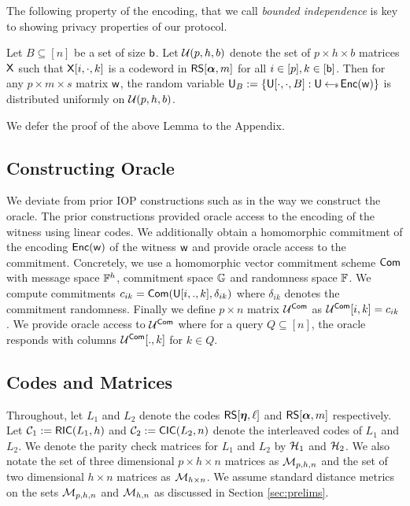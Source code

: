 The following property of the encoding, that we call {\em bounded independence}
is key to showing privacy properties of our protocol.
\begin{lemma}\label{lem:boundedindependence}
Let $B\subseteq [n]$ be a set of size $\mathsf{b}$. Let $\mathcal{U}(p,h,b)$ denote the
set of $p\times h\times b$ matrices $\mathsf{X}$ such
that $\mathsf{X}[i,\cdot,k]$ is a codeword in $\mathsf{RS}[\bm{\alpha},m]$ for all $i\in
[p],k\in [\mathsf{b}]$. Then for any $p\times m\times s$ matrix $\mathsf{w}$, the random
variable $\mathsf{U}_B := \{\mathsf{U}[\cdot,\cdot,B]: \mathsf{U}\hskip2.3pt{\gets\!\!\mbox{\tiny${\$}$\normalsize}}\, \mathsf{Enc}(\mathsf{w})\}$ is
distributed uniformly on $\mathcal{U}(p,h,b)$.
\end{lemma}
We defer the proof of the above Lemma to the Appendix.

\subsection{Constructing Oracle}\label{sec:construct_oracle} 
We deviate from prior IOP constructions
such as \cite{ligero,Aurora} in the way we construct the oracle. The prior
constructions provided oracle access to the encoding of the witness using linear
codes. We
additionally obtain a homomorphic commitment of the encoding $\mathsf{Enc}(\mathsf{w})$ of the
witness $\mathsf{w}$ and provide oracle access to the commitment. Concretely, we use a
homomorphic vector commitment scheme $\mathsf{Com}$ with message space $\mathbb{F}^h$,
commitment space $\mathbb{G}$ and randomness space $\mathbb{F}$. We compute commitments
$c_{ik}=\mathsf{Com}(\mathsf{U}[i,.,k],\delta_{ik})$ where $\delta_{ik}$ denotes the
commitment randomness. Finally we define $p\times n$ matrix $\mathcal{U}^{\mathsf{Com}}$ as
$\mathcal{U}^{\mathsf{Com}}[i,k]=c_{ik}$. We provide oracle access to $\mathcal{U}^{\mathsf{Com}}$ where for a
query $Q\subseteq [n]$, the oracle responds with columns $\mathcal{U}^{\mathsf{Com}}[.,k]$ for
$k\in Q$.

\subsection{Codes and Matrices}\label{sec:codesandmatrices}
Throughout, let $L_1$ and $L_2$ denote the codes $\mathsf{RS}[\bm{\eta},\ell]$ and
$\mathsf{RS}[\bm{\alpha},m]$ respectively. Let $\mathcal{C}_1 := \mathsf{RIC}(L_1,h)$ and $\mathcal{C}_2 :=
\mathsf{CIC}(L_2,n)$ denote the interleaved codes of $L_1$ and $L_2$. We denote the
parity check matrices for $L_1$ and $L_2$ by $\mathcal{H}_1$ and $\mathcal{H}_2$. We also
notate the set of three dimensional $p\times h\times n$ matrices as $\mathcal{M}_{p,h,n}$ and
the set of two dimensional $h\times n$ matrices as $\mathcal{M}_{h\times n}$. We
assume standard distance metrics on the sets $\mathcal{M}_{p,h,n}$ and $\mathcal{M}_{h,n}$
as discussed in Section \ref{sec:prelims}. 

